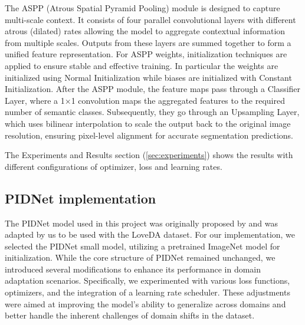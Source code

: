\documentclass[10pt,twocolumn,letterpaper]{article}
\begin{document}
The ASPP (Atrous Spatial Pyramid Pooling) module is designed to capture multi-scale context. It consists of four parallel convolutional layers with different atrous (dilated) rates allowing the model to aggregate contextual information from multiple scales. Outputs from these layers are summed together to form a unified feature representation.
For ASPP weights, initialization techniques are applied to ensure stable and effective training. In particular the weights are initialized using Normal Initialization while biases are initialized with Constant Initialization.
After the ASPP module, the feature maps pass through a Classifier Layer, where a 1×1 convolution maps the aggregated features to the required number of semantic classes. Subsequently, they go through an Upsampling Layer, which uses bilinear interpolation to scale the output back to the original image resolution, ensuring pixel-level alignment for accurate segmentation predictions.

The Experiments and Results section (\ref{sec:experiments}) shows the results with different configurations of optimizer, loss and learning rates. 


\subsection{PIDNet implementation}

The PIDNet model used in this project was originally proposed by \cite{feng2021pidnet} and was adapted by us to be used with the LoveDA dataset. For our implementation, we selected the PIDNet small model, utilizing a pretrained ImageNet model for initialization. While the core structure of PIDNet remained unchanged, we introduced several modifications to enhance its performance in domain adaptation scenarios. Specifically, we experimented with various loss functions, optimizers, and the integration of a learning rate scheduler. These adjustments were aimed at improving the model's ability to generalize across domains and better handle the inherent challenges of domain shifts in the dataset.
\end{document}
